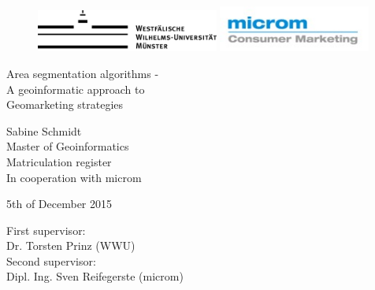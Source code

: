 
\thispagestyle{empty}

	
		\begin{center}
			
						\begin{figure}[htbp]
						\begin{minipage}[b][1cm]{0.6\textwidth}
						\includegraphics[width=6cm]{images/WWU_Logo1_1c}
						\end{minipage}
						\hfill
						\begin{minipage}[b][1cm]{0.3\textwidth}
						\includegraphics[width=5cm]{images/microm.jpg}
						\end{minipage}
						\end{figure}
			
				\par
				\vspace*{14ex}
		\Huge
					Area segmentation algorithms - \\
					A geoinformatic approach to \\
					Geomarketing strategies\\
				\par
		\normalsize
		\large
					 
			
				\vspace*{15ex}
					Sabine Schmidt\\
					Master of Geoinformatics\\
					Matriculation register\\
					In cooperation with microm
					
					5th of December 2015
				\par
			\end{center}
			
			\vspace*{25ex}
			First supervisor:\\
			Dr. Torsten Prinz (WWU)\\
			Second supervisor:\\
			Dipl. Ing. Sven Reifegerste (microm)